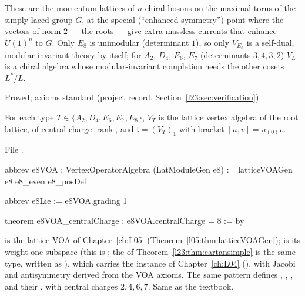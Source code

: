 \begin{physics}
These are the momentum lattices of $n$ chiral bosons on the maximal torus of the simply-laced group $G$, at the special
(``enhanced-symmetry'') point where the vectors of norm $2$ --- the roots --- give extra massless currents that enhance $U(1)^n$ to
$G$. Only $E_8$ is unimodular (determinant $1$), so only $V_{E_8}$ is a self-dual, modular-invariant theory by itself; for $A_2$,
$D_4$, $E_6$, $E_7$ (determinants $3,4,3,2$) $V_L$ is a chiral algebra whose modular-invariant completion needs the other cosets
$L^*/L$.
\end{physics}

\begin{status}
Proved; axioms standard (project record, Section~\ref{l23:sec:verification}).
\end{status}

\begin{definition}\label{l23:def:latticeLie}
For each type $T\in\{A_2,D_4,E_6,E_7,E_8\}$, $V_T$ is the lattice vertex algebra of the root lattice, of central charge
$\operatorname{rank}$, and $\mathfrak t=(V_T)_1$ with bracket $[u,v]=u_{(0)}v$.
\end{definition}
\noindent File .
\begin{leancode}
abbrev e8VOA : VertexOperatorAlgebra (LatModuleGen e8) :=
  latticeVOAGen e8 e8_even e8_posDef

abbrev e8Lie := e8VOA.grading 1

theorem e8VOA_centralCharge : e8VOA.centralCharge = 8 := by
\end{leancode}

\begin{dictionary}
 is the lattice VOA of Chapter~\ref{ch:L05} (Theorem~\ref{l05:thm:latticeVOAGen});
 is its weight-one subspace (this  is ; the 
of Theorem~\ref{l23:thm:cartansimple} is the same type, written as ), which carries the  instance of Chapter~\ref{ch:L04}
(), with Jacobi and antisymmetry derived from the VOA axioms. The same pattern defines
, , ,  and their , with central charges $2,4,6,7$. Same as the textbook.
\end{dictionary}

